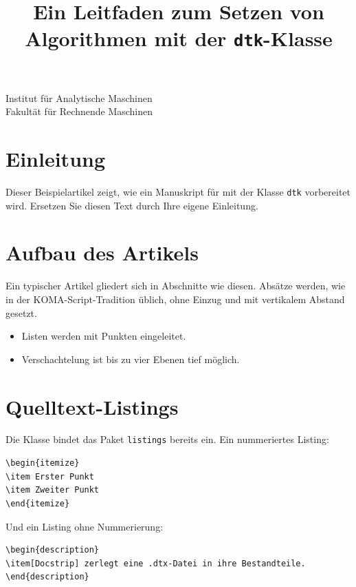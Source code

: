 \documentclass[ngerman]{dtk}
\begin{document}
\title{Ein Leitfaden zum Setzen von Algorithmen mit der \texttt{dtk}-Klasse}
%
    {Institut für Analytische Maschinen\\
     }
%
    {Fakultät für Rechnende Maschinen\\
     }
\maketitle

\section{Einleitung}
Dieser Beispielartikel zeigt, wie ein Manuskript für \journalname{} mit der
Klasse \texttt{dtk} vorbereitet wird. Ersetzen Sie diesen Text durch Ihre
eigene Einleitung.

\section{Aufbau des Artikels}
Ein typischer Artikel gliedert sich in Abschnitte wie diesen. Absätze werden,
wie in der KOMA-Script-Tradition üblich, ohne Einzug und mit vertikalem
Abstand gesetzt.

\begin{itemize}
\item Listen werden mit Punkten eingeleitet.
\item Verschachtelung ist bis zu vier Ebenen tief möglich.
\end{itemize}

\section{Quelltext-Listings}
Die Klasse bindet das Paket \texttt{listings} bereits ein. Ein nummeriertes
Listing:

\begin{lstlisting}[style=number]
\begin{itemize}
\item Erster Punkt
\item Zweiter Punkt
\end{itemize}
\end{lstlisting}

Und ein Listing ohne Nummerierung:

\begin{lstlisting}[style=noNumber]
\begin{description}
\item[Docstrip] zerlegt eine .dtx-Datei in ihre Bestandteile.
\end{description}
\end{lstlisting}
\end{document}
